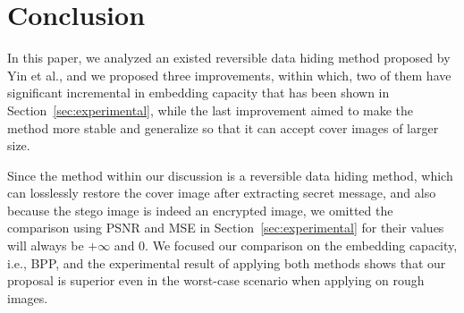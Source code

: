\section{Conclusion}
\label{sec:conclusion}

In this paper, we analyzed an existed reversible data hiding method proposed by Yin et al., and we proposed three improvements, within which, two of them have significant incremental in embedding capacity that has been shown in Section~\ref{sec:experimental}, while the last improvement aimed to make the method more stable and generalize so that it can accept cover images of larger size. 

Since the method within our discussion is a reversible data hiding method, 
which can losslessly restore the cover image after extracting secret message, 
and also because the stego image is indeed an encrypted image, 
we omitted the comparison using PSNR and MSE in Section~\ref{sec:experimental} for their values will always be $+\infty$ and $0$.
We focused our comparison on the embedding capacity, i.e., BPP, and the experimental result of applying both methods shows that our proposal is superior even in the worst-case scenario when applying on rough images. 